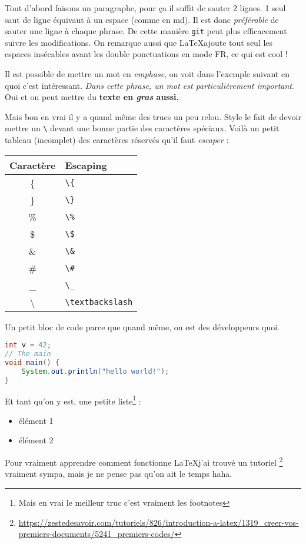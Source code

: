 \documentclass[french]{article}
\begin{document}
Tout d'abord faisons un paragraphe, pour ça il suffit de sauter 2 lignes.
1 seul saut de ligne équivaut à un espace (comme en md).
Il est donc \emph{préférable} de sauter une ligne à chaque phrase.
De cette manière \lstinline{git} peut plus efficacement suivre les modifications.
On remarque aussi que \LaTeX ajoute tout seul les espaces insécables avant les double ponctuations en mode FR, ce qui est cool !

Il est possible de mettre un mot en \emph{emphase}, on voit dans l'exemple suivant en quoi c'est intéressant.
\textit{Dans cette phrase, un mot est \emph{particulièrement} important}.
Oui et on peut mettre du \textbf{texte en \emph{gras} aussi.}


Mais bon en vrai il y a quand même des trucs un peu relou.
Style le fait de devoir mettre un \lstinline{\} devant une bonne partie des caractères spéciaux.
Voilà un petit tableau (incomplet) des caractères réservés qu'il faut \emph{escaper} :

\begin{tabular}{ c l }
	Caractère & Escaping \\
	\hline
	\{ & \verb|\{| \\
	\} & \verb|\}| \\
	\% & \verb|\%| \\
	\$ & \verb|\$| \\
	\& & \verb|\&| \\
	\# & \verb|\#| \\
	\_ & \verb|\_| \\
	\textbackslash & \verb|\textbackslash|
\end{tabular}

\newpage
Un petit bloc de code parce que quand même, on est des développeurs quoi.
\begin{lstlisting}[language=java]
int v = 42;
// The main
void main() {
	System.out.println("hello world!");
}
\end{lstlisting}

Et tant qu'on y est, une petite liste\footnote{Mais en vrai le meilleur truc c'est vraiment les footnotes} :
\begin{itemize}
	\item élément 1
	\item élément 2
\end{itemize}

Pour vraiment apprendre comment fonctionne \LaTeX j'ai trouvé un tutoriel
\footnote{\raggedright\url{https://zestedesavoir.com/tutoriels/826/introduction-a-latex/1319_creer-vos-premiers-documents/5241_premiers-codes/}}
vraiment sympa, mais je ne pense pas qu'on ait le temps haha.
\end{document}
